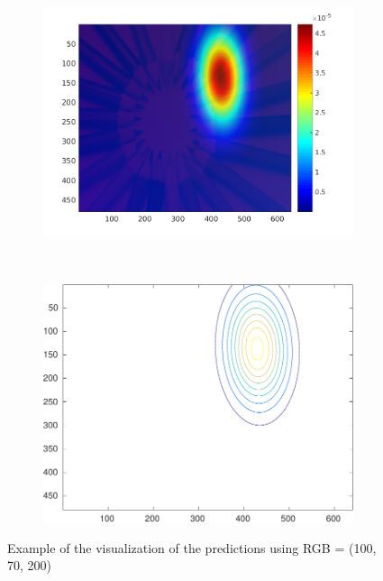 \documentclass{article}
\begin{document}
\begin{figure}
  \centering
  \begin{subfigure}[b]{0.5\textwidth}
    \includegraphics[width=\textwidth]{dorota_img.pdf}
    \label{fig:heatmap}
  \end{subfigure}%
~
  \begin{subfigure}[b]{0.45\textwidth}
    \includegraphics[width=\textwidth]{dorota_contour-crop}
    \label{fig:contour}
  \end{subfigure}
  \caption{Example of the visualization of the predictions using RGB =
    (100, 70, 200)}
\label{fig:predvisualization}
\end{figure}
\end{document}
